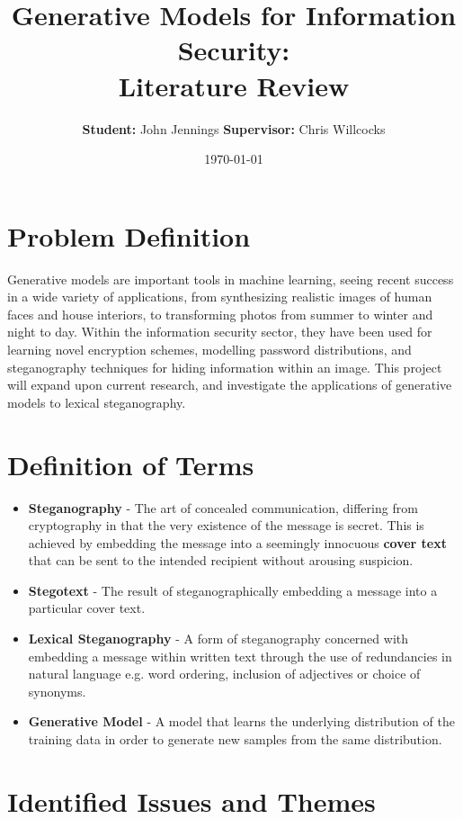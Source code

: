\documentclass[11pt,a4paper]{article}
\title{Generative Models for Information Security: \\ Literature Review}
\author{{\bf Student:} John Jennings  \hspace{3mm} {\bf Supervisor:} Chris Willcocks}
\date{\today}
\begin{document}
 
\maketitle 

\section *{Problem Definition}
Generative models are important tools in machine learning, seeing recent success in a wide variety of applications, from synthesizing realistic images of human faces and house interiors, to transforming photos from summer to winter and night to day. Within the information security sector, they have been used for learning novel encryption schemes, modelling password distributions, and steganography techniques for hiding information within an image. This project will expand upon current research, and investigate the applications of generative models to lexical steganography.

\section *{Definition of Terms}
\begin{itemize}[leftmargin=0pt]
\item[] \textbf{Steganography} - The art of concealed communication, differing from cryptography in that the very existence of the message is secret. This is achieved by embedding the message into a seemingly innocuous \textbf{cover text} that can be sent to the intended recipient without arousing suspicion. 

\item[] \textbf{Stegotext} - The result of steganographically embedding a message into a particular cover text.

\item[] \textbf{Lexical Steganography} - A form of steganography concerned with embedding a message within written text through the use of redundancies in natural language e.g. word ordering, inclusion of adjectives or choice of synonyms.

\item[] \textbf{Generative Model} - A model that learns the underlying distribution of the training data in order to generate new samples from the same distribution.

\end{itemize}

\section *{Identified Issues and Themes}
\end{document}
